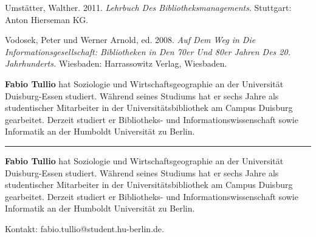 \documentclass[a4paper,
fontsize=11pt,
oneside,
numbers=noperiodatend,
parskip=half-,
bibliography=totoc,
final
]{scrartcl}
\begin{document}
Umstätter, Walther. 2011. \emph{Lehrbuch Des Bibliotheksmanagements}.
Stuttgart: Anton Hierseman KG.

Vodosek, Peter und Werner Arnold, ed. 2008. \emph{Auf Dem Weg in Die
Informationsgesellschaft: Bibliotheken in Den 70er Und 80er Jahren Des
20. Jahrhunderts.} Wiesbaden: Harrassowitz Verlag, Wiesbaden.

\textbf{Fabio Tullio} hat Soziologie und Wirtschaftsgeographie an der
Universität Duisburg-Essen studiert. Während seines Studiums hat er
sechs Jahre als studentischer Mitarbeiter in der Universitätsbibliothek
am Campus Duisburg gearbeitet. Derzeit studiert er Bibliotheks- und
Informationswissenschaft sowie Informatik an der Humboldt Universität zu
Berlin.

\begin{center}\rule{0.5\linewidth}{\linethickness}\end{center}

\textbf{Fabio Tullio} hat Soziologie und Wirtschaftsgeographie an der
Universität Duisburg-Essen studiert. Während seines Studiums hat er
sechs Jahre als studentischer Mitarbeiter in der Universitätsbibliothek
am Campus Duisburg gearbeitet. Derzeit studiert er Bibliotheks- und
Informationswissenschaft sowie Informatik an der Humboldt Universität zu
Berlin. 

Kontakt: fabio.tullio@student.hu-berlin.de.
\end{document}
